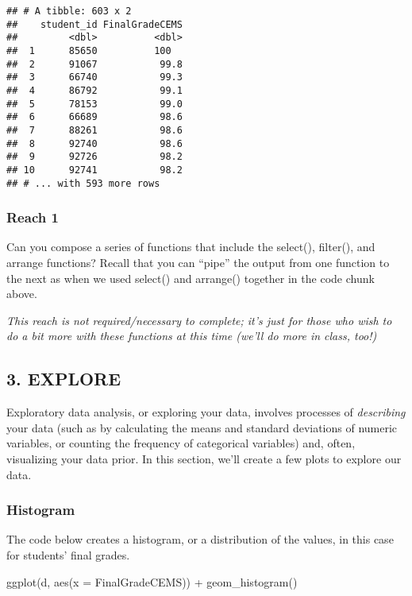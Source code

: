\documentclass[
]{article}
\newenvironment{Shaded}{\begin{snugshade}}{\end{snugshade}}
\newcommand{\AttributeTok}[1]{\textcolor[rgb]{0.77,0.63,0.00}{#1}}
\newcommand{\FunctionTok}[1]{\textcolor[rgb]{0.00,0.00,0.00}{#1}}
\newcommand{\NormalTok}[1]{#1}
\newcommand{\SpecialCharTok}[1]{\textcolor[rgb]{0.00,0.00,0.00}{#1}}
\begin{document}
\begin{verbatim}
## # A tibble: 603 x 2
##    student_id FinalGradeCEMS
##         <dbl>          <dbl>
##  1      85650          100  
##  2      91067           99.8
##  3      66740           99.3
##  4      86792           99.1
##  5      78153           99.0
##  6      66689           98.6
##  7      88261           98.6
##  8      92740           98.6
##  9      92726           98.2
## 10      92741           98.2
## # ... with 593 more rows
\end{verbatim}

\hypertarget{reach-1}{%
\subsubsection{Reach 1 🎉}\label{reach-1}}

Can you compose a series of functions that include the select(),
filter(), and arrange functions? Recall that you can ``pipe'' the output
from one function to the next as when we used select() and arrange()
together in the code chunk above.

\emph{This reach is not required/necessary to complete; it's just for
those who wish to do a bit more with these functions at this time (we'll
do more in class, too!)}

\hypertarget{explore}{%
\subsection{3. EXPLORE}\label{explore}}

Exploratory data analysis, or exploring your data, involves processes of
\emph{describing} your data (such as by calculating the means and
standard deviations of numeric variables, or counting the frequency of
categorical variables) and, often, visualizing your data prior. In this
section, we'll create a few plots to explore our data.

\hypertarget{histogram}{%
\subsubsection{Histogram}\label{histogram}}

The code below creates a histogram, or a distribution of the values, in
this case for students' final grades.

\begin{Shaded}
\begin{Highlighting}[]
\FunctionTok{ggplot}\NormalTok{(d, }\FunctionTok{aes}\NormalTok{(}\AttributeTok{x =}\NormalTok{ FinalGradeCEMS)) }\SpecialCharTok{+}
  \FunctionTok{geom\_histogram}\NormalTok{()}
\end{Highlighting}
\end{Shaded}
\end{document}
